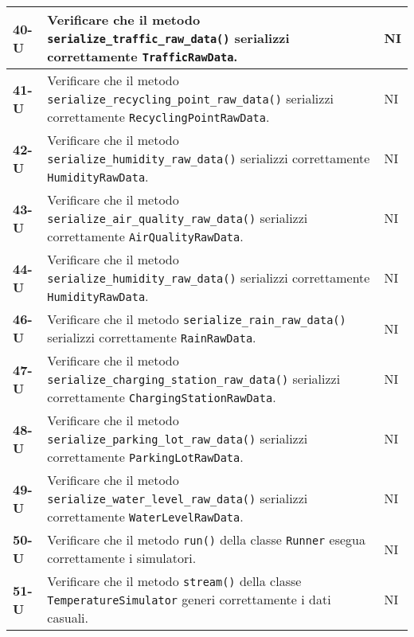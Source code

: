 \begin{longtable}{|>{\raggedright\arraybackslash}m{}|>{\raggedright\arraybackslash}m{}|>{\raggedright\arraybackslash}m{}|}
	\hline
	\textbf{40-U}   & Verificare che il metodo \texttt{serialize\_traffic\_raw\_data()} serializzi correttamente \texttt{TrafficRawData}.                                               & NI             \\
	\hline
	\textbf{41-U}   & Verificare che il metodo \texttt{serialize\_recycling\_point\_raw\_data()} serializzi correttamente \texttt{RecyclingPointRawData}.                               & NI             \\
	\hline
	\textbf{42-U}   & Verificare che il metodo \texttt{serialize\_humidity\_raw\_data()} serializzi correttamente \texttt{HumidityRawData}.                                             & NI             \\
	\hline
	\textbf{43-U}   & Verificare che il metodo \texttt{serialize\_air\_quality\_raw\_data()} serializzi correttamente \texttt{AirQualityRawData}.                                       & NI             \\
	\hline
	\textbf{44-U}   & Verificare che il metodo \texttt{serialize\_humidity\_raw\_data()} serializzi correttamente \texttt{HumidityRawData}.                                             & NI             \\
	\hline
	\textbf{46-U}   & Verificare che il metodo \texttt{serialize\_rain\_raw\_data()} serializzi correttamente \texttt{RainRawData}.                                                     & NI             \\
	\hline
	\textbf{47-U}   & Verificare che il metodo \texttt{serialize\_charging\_station\_raw\_data()} serializzi correttamente \texttt{ChargingStationRawData}.                             & NI             \\
	\hline
	\textbf{48-U}   & Verificare che il metodo \texttt{serialize\_parking\_lot\_raw\_data()} serializzi correttamente \texttt{ParkingLotRawData}.                                       & NI             \\
	\hline
	\textbf{49-U}   & Verificare che il metodo \texttt{serialize\_water\_level\_raw\_data()} serializzi correttamente \texttt{WaterLevelRawData}.                                       & NI             \\
	\hline
	\textbf{50-U}   & Verificare che il metodo \texttt{run()} della classe \texttt{Runner} esegua correttamente i simulatori.                                                           & NI             \\
	\hline
	\textbf{51-U}   & Verificare che il metodo \texttt{stream()} della classe \texttt{TemperatureSimulator} generi correttamente i dati casuali.                                        & NI             \\

\end{longtable}
